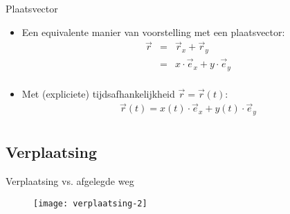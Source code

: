 \begin{frame}{Plaatsvector}
\begin{itemize}
\item<1-> Een equivalente manier van voorstelling met een plaatsvector:
\begin{eqnarray*}
	\vec{r}
	&=&\vec{r}_x+\vec{r}_y\\
	&=&x\cdot\vec{e}_x+y\cdot\vec{e}_y\\
\end{eqnarray*}	
\item<2-> Met (expliciete) tijdsafhankelijkheid $\vec{r}=\vec{r}(t)$:
\begin{eqnarray*}
	\vec{r}(t)=x(t)\cdot\vec{e}_x+y(t)\cdot\vec{e}_y\\
\end{eqnarray*}	
\end{itemize}
\end{frame}





\subsection{Verplaatsing}

\begin{frame}{Verplaatsing vs. afgelegde weg}
\begin{figure}
\texttt{[image: verplaatsing-2]}
\end{figure}
\end{frame}

